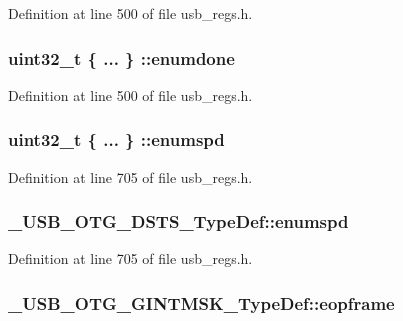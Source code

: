 Definition at line 500 of file usb\-\_\-regs.\-h.

\hypertarget{group___u_s_b___o_t_g___d_r_i_v_e_r_gaeecfaf0d54606e5f12bb3eadaf7257bb}{
\subsubsection[{enumdone}]{\setlength{\rightskip}{0pt plus 5cm}uint32\-\_\-t \{ ... \} \-::enumdone}}\label{group___u_s_b___o_t_g___d_r_i_v_e_r_gaeecfaf0d54606e5f12bb3eadaf7257bb}


Definition at line 500 of file usb\-\_\-regs.\-h.

\hypertarget{group___u_s_b___o_t_g___d_r_i_v_e_r_ga55300dcb3f5f2b4bca184f58140582a9}{
\subsubsection[{enumspd}]{\setlength{\rightskip}{0pt plus 5cm}uint32\-\_\-t \{ ... \} \-::enumspd}}\label{group___u_s_b___o_t_g___d_r_i_v_e_r_ga55300dcb3f5f2b4bca184f58140582a9}


Definition at line 705 of file usb\-\_\-regs.\-h.

\hypertarget{group___u_s_b___o_t_g___d_r_i_v_e_r_gae7ed8264debc9dd05d3933b3e4b05216}{
\subsubsection[{enumspd}]{ \-\_\-\-U\-S\-B\-\_\-\-O\-T\-G\-\_\-\-D\-S\-T\-S\-\_\-\-Type\-Def\-::enumspd}}\label{group___u_s_b___o_t_g___d_r_i_v_e_r_gae7ed8264debc9dd05d3933b3e4b05216}


Definition at line 705 of file usb\-\_\-regs.\-h.

\hypertarget{group___u_s_b___o_t_g___d_r_i_v_e_r_gaa41af202a77badbee7d1e29d3b3f95e9}{
\subsubsection[{eopframe}]{ \-\_\-\-U\-S\-B\-\_\-\-O\-T\-G\-\_\-\-G\-I\-N\-T\-M\-S\-K\-\_\-\-Type\-Def\-::eopframe}}\label{group___u_s_b___o_t_g___d_r_i_v_e_r_gaa41af202a77badbee7d1e29d3b3f95e9}



